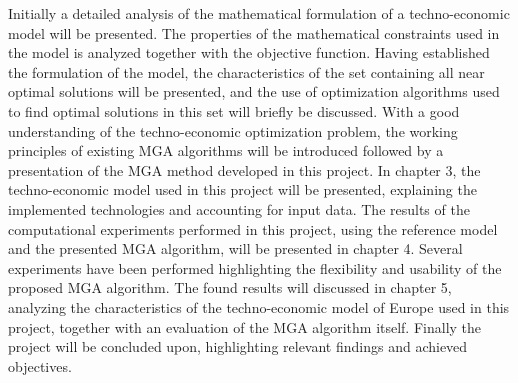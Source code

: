 Initially a detailed analysis of the mathematical formulation of a techno-economic model will be presented. The properties of the mathematical constraints used in the model is analyzed together with the objective function. Having established the formulation of the model, the characteristics of the set containing all near optimal solutions will be presented, and the use of optimization algorithms used to find optimal solutions in this set will briefly be discussed. With a good understanding of the techno-economic optimization problem, the working principles of existing MGA algorithms will be introduced followed by a presentation of the MGA method developed in this project. 
In chapter 3, the techno-economic model used in this project will be presented, explaining the implemented technologies and accounting for input data. The results of the computational experiments performed in this project, using the reference model and the presented MGA algorithm, will be presented in chapter 4. Several experiments have been performed highlighting the flexibility and usability of the proposed MGA algorithm. The found results will discussed in chapter 5, analyzing the characteristics of the techno-economic model of Europe used in this project, together with an evaluation of the MGA algorithm itself. Finally the project will be concluded upon, highlighting relevant findings and achieved objectives. 




